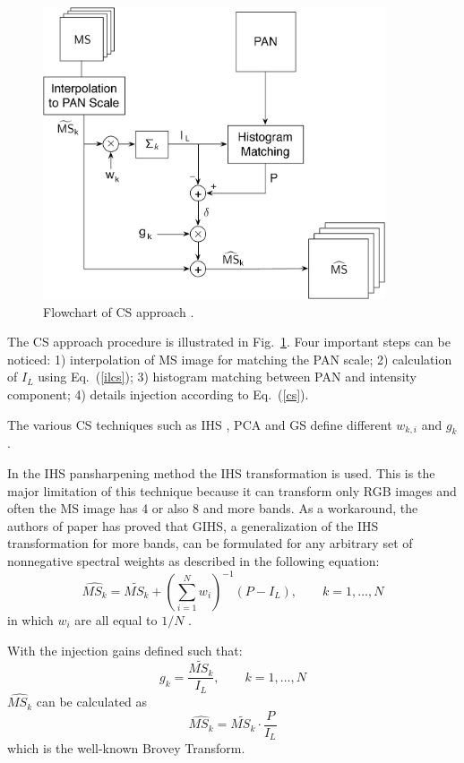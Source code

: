 \documentclass[12pt]{report}
\begin{document}
\begin{figure}[t!]
\centering
\includegraphics[width=0.9\textwidth]{cs.png}
\caption{Flowchart of CS approach \cite{criticalComparison}.}
\label{fig:csapproach}
\end{figure}


The CS approach procedure is illustrated in  Fig.~\ref{fig:csapproach}. Four important steps can be noticed: 
1) interpolation of MS image for matching the PAN scale; 2) calculation of $I_L$ using Eq.~(\ref{ilcs}); 3) histogram matching between PAN and intensity component; 4) details injection according to Eq.~(\ref{cs}).

The various CS techniques such as IHS \cite{ihs1,ihs2}, PCA \cite{pca2,changedetection} and GS \cite{gs,cs3} define different $w_{k,i}$ and $g_k$.

In the IHS pansharpening method the IHS transformation is used. This is the major limitation of this technique because it can transform only RGB images and often the MS image has 4 or also 8 and more bands. As a workaround, the authors of paper \cite{cs6} has proved that GIHS, a generalization of the IHS transformation for more bands, can be formulated for any arbitrary set of nonnegative spectral weights as described in the following equation: 
%
\begin{equation}
    \widehat{MS_k} = \widetilde{MS_k} + \left(\sum_{i=1}^{N}w_i\right)^{-1}(P - I_L), \qquad 
    k = 1,\dots,N
    \label{cs2}
\end{equation}
%
in which $w_i$ are all equal to $1/N$ \cite{ihs1}.

With the injection gains defined such that:
\begin{equation}
    g_k = \frac{\widetilde{MS_k}}{I_L}, \qquad k = 1,\dots,N
    \label{csgk}
\end{equation}
%
$\widehat{MS_k}$ can be calculated as 
\begin{equation}
    \widehat{MS_k} = \widetilde{MS_k} \cdot \frac{P}{I_L}
    \label{csfinal}
\end{equation}
%
which is the well-known Brovey Transform. 
\end{document}
